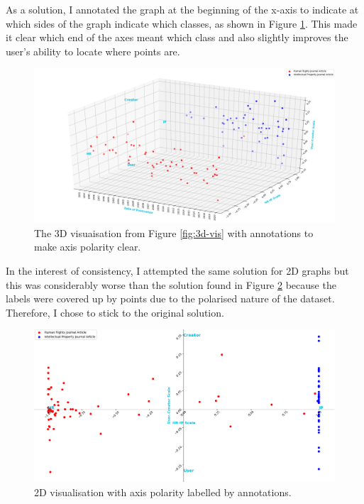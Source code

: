 			As a solution, I annotated the graph at the beginning of the x-axis to indicate at which sides of the graph indicate which classes, as shown in Figure \ref{fig:3d-float}. This made it clear which end of the axes meant which class and also slightly improves the user's ability to locate where points are. 
			\begin{figure}
    			\centering
    			\includegraphics[width=0.9\linewidth]{resources/images/3d_float_label.png}
    			\caption{The 3D visuaisation from Figure \ref{fig:3d-vis} with annotations to make axis polarity clear.}
    			\label{fig:3d-float}
			\end{figure}

			In the interest of consistency, I attempted the same solution for 2D graphs but this was considerably worse than the solution found in Figure \ref{fig:2d-float} because the labels were covered up by points due to the polarised nature of the dataset. Therefore, I chose to stick to the original solution.
			\begin{figure}
    			\centering
    			\includegraphics[width=0.9\linewidth]{resources/images/2d_float_label.png}
    			\caption{2D visualisation with axis polarity labelled by annotations.}
    			\label{fig:2d-float}
			\end{figure}
			
